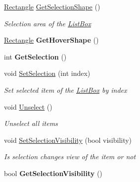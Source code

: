 \begin{DoxyCompactItemize}
\item 
\mbox{\hyperlink{class_space_v_i_l_1_1_rectangle}{Rectangle}} \mbox{\hyperlink{class_space_v_i_l_1_1_list_box_a27bec173b7b8fccd930afe3e6f3d63c2}{Get\+Selection\+Shape}} ()
\begin{DoxyCompactList}\small\item\em Selection area of the \mbox{\hyperlink{class_space_v_i_l_1_1_list_box}{List\+Box}} \end{DoxyCompactList}\item 
\mbox{\label{class_space_v_i_l_1_1_list_box_ad7a324005cf9d1d88acc32123910dabe}} 
\mbox{\hyperlink{class_space_v_i_l_1_1_rectangle}{Rectangle}} {\bfseries Get\+Hover\+Shape} ()
\item 
\mbox{\label{class_space_v_i_l_1_1_list_box_a98c7e5ac7657e77e49c2fd0d54b7ddcb}} 
int {\bfseries Get\+Selection} ()
\item 
void \mbox{\hyperlink{class_space_v_i_l_1_1_list_box_a8a669fef109cdf5987cdb97af858d3fb}{Set\+Selection}} (int index)
\begin{DoxyCompactList}\small\item\em Set selected item of the \mbox{\hyperlink{class_space_v_i_l_1_1_list_box}{List\+Box}} by index \end{DoxyCompactList}\item 
void \mbox{\hyperlink{class_space_v_i_l_1_1_list_box_abc68331993bf0f0c54775f309edfc83b}{Unselect}} ()
\begin{DoxyCompactList}\small\item\em Unselect all items \end{DoxyCompactList}\item 
void \mbox{\hyperlink{class_space_v_i_l_1_1_list_box_af01fa2d7d867b5da7847844f64405cad}{Set\+Selection\+Visibility}} (bool visibility)
\begin{DoxyCompactList}\small\item\em Is selection changes view of the item or not \end{DoxyCompactList}\item 
\mbox{\label{class_space_v_i_l_1_1_list_box_aa7822a48e4eccb17e81f28c565e9b73c}} 
bool {\bfseries Get\+Selection\+Visibility} ()
\item 
\mbox{\label{class_space_v_i_l_1_1_list_box_a446f0aeb6b309d517317ac95445f49a7}} 

\end{DoxyCompactItemize}
